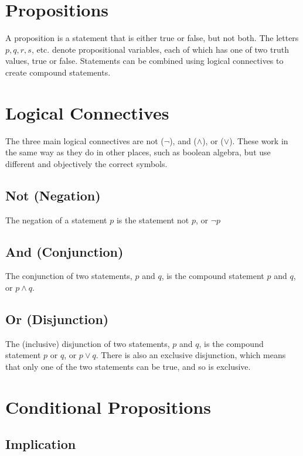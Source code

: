 
\section*{Propositions}

A proposition is a statement that is either true or false, but not both. The letters $p, q, r, s$, etc. denote
 propositional variables, each of which has one of two truth values, true or false. Statements can be combined using
 logical connectives to create compound statements.

\section*{Logical Connectives}

The three main logical connectives are not ($\neg$), and ($\wedge$), or ($\vee$). These work in the same way as they do in
 other places, such as boolean algebra, but use different and objectively the correct symbols.

\subsection*{Not (Negation)}

The negation of a statement $p$ is the statement not $p$, or $\neg p$

\subsection*{And (Conjunction)}

The conjunction of two statements, $p$ and $q$, is the compound statement $p$ and $q$, or $p \wedge q$.

\subsection*{Or (Disjunction)}

The (inclusive) disjunction of two statements, $p$ and $q$, is the compound statement $p$ or $q$, or $p \vee q$. There
 is also an exclusive disjunction, which means that only one of the two statements can be true, and so is exclusive.

\section*{Conditional Propositions}

\subsection*{Implication}

